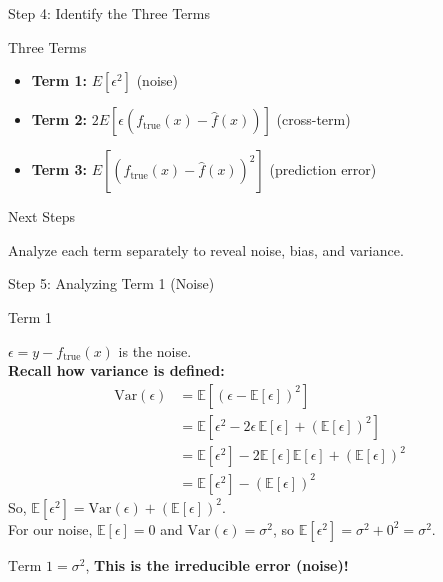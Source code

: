 \documentclass[10pt]{beamer}
\begin{document}
\begin{frame}{Step 4: Identify the Three Terms}
\small
\begin{definitionbox}{Three Terms}
\raggedright
\begin{itemize}
\item \textbf{Term 1:} $E[\epsilon^2]$ (noise)
\item \textbf{Term 2:} $2E[\epsilon(f_{\text{true}}(x) - \hat{f}(x))]$ (cross-term)
\item \textbf{Term 3:} $E[(f_{\text{true}}(x) - \hat{f}(x))^2]$ (prediction error)
\end{itemize}
\end{definitionbox}

\begin{keypointsbox}{Next Steps}
\raggedright
Analyze each term separately to reveal noise, bias, and variance.
\end{keypointsbox}
\end{frame}

\begin{frame}{Step 5: Analyzing Term 1 (Noise)}
\small
\begin{definitionbox}{Term 1}
\raggedright
$\epsilon = y - f_{\text{true}}(x)$ is the noise.\\[1ex]
\textbf{Recall how variance is defined:}
\begin{align*}
\text{Var}(\epsilon)
&= \mathbb{E}\left[(\epsilon - \mathbb{E}[\epsilon])^2\right] \\[6pt]
&= \mathbb{E}\left[\epsilon^2 - 2\epsilon \, \mathbb{E}[\epsilon] + (\mathbb{E}[\epsilon])^2\right] \\[6pt]
&= \mathbb{E}[\epsilon^2] - 2\mathbb{E}[\epsilon]\mathbb{E}[\epsilon] + (\mathbb{E}[\epsilon])^2 \\[6pt]
&= \mathbb{E}[\epsilon^2] - (\mathbb{E}[\epsilon])^2
\end{align*}
So, \(\mathbb{E}[\epsilon^2] = \text{Var}(\epsilon) + \left(\mathbb{E}[\epsilon]\right)^2\). 
\\For our noise, \(\mathbb{E}[\epsilon] = 0\) and \(\text{Var}(\epsilon) = \sigma^2\), so 
\(\mathbb{E}[\epsilon^2] = \sigma^2 + 0^2 = \sigma^2\).
 
$\boxed{\text{Term 1} = \sigma^2}$, \textbf{This is the irreducible error (noise)!}
\end{definitionbox}

\end{frame}
\end{document}
